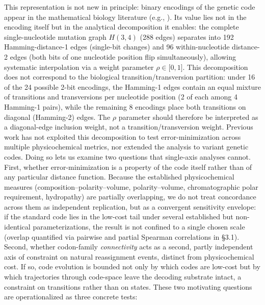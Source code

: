 \documentclass[preprint,11pt,authoryear,a4paper]{elsarticle}
\begin{document}
This representation is not new in principle: binary encodings of the
genetic code appear in the mathematical biology literature (e.g.,
\citep{antoneli2011}). Its value lies not in the encoding itself but in
the analytical decomposition it enables: the complete single-nucleotide
mutation graph \(H(3,4)\) (288 edges) separates into 192
Hamming-distance-1 edges (single-bit changes) and 96 within-nucleotide
distance-2 edges (both bits of one nucleotide position flip
simultaneously), allowing systematic interpolation via a weight
parameter \(\rho \in \lbrack 0,1\rbrack\). This decomposition does not
correspond to the biological transition/transversion partition: under 16
of the 24 possible 2-bit encodings, the Hamming-1 edges contain an equal
mixture of transitions and transversions per nucleotide position (2 of
each among 4 Hamming-1 pairs), while the remaining 8 encodings place
both transitions on diagonal (Hamming-2) edges. The \(\rho\) parameter
should therefore be interpreted as a diagonal-edge inclusion weight, not
a transition/transversion weight. Previous work has not exploited this
decomposition to test error-minimization across multiple physicochemical
metrics, nor extended the analysis to variant genetic codes. Doing so
lets us examine two questions that single-axis analyses cannot. First,
whether error-minimization is a property of the code itself rather than
of any particular distance function. Because the established
physicochemical measures (composition--polarity--volume,
polarity--volume, chromatographic polar requirement, hydropathy) are
partially overlapping, we do not treat concordance across them as
independent replication, but as a convergent sensitivity envelope: if
the standard code lies in the low-cost tail under several established
but non-identical parameterizations, the result is not confined to a
single chosen scale (overlap quantified via pairwise and partial
Spearman correlations in §3.1). Second, whether codon-family
\emph{connectivity} acts as a second, partly independent axis of
constraint on natural reassignment events, distinct from physicochemical
cost. If so, code evolution is bounded not only by which codes are
low-cost but by which trajectories through code-space leave the decoding
substrate intact, a constraint on transitions rather than on states.
These two motivating questions are operationalized as three concrete
tests:
\end{document}
